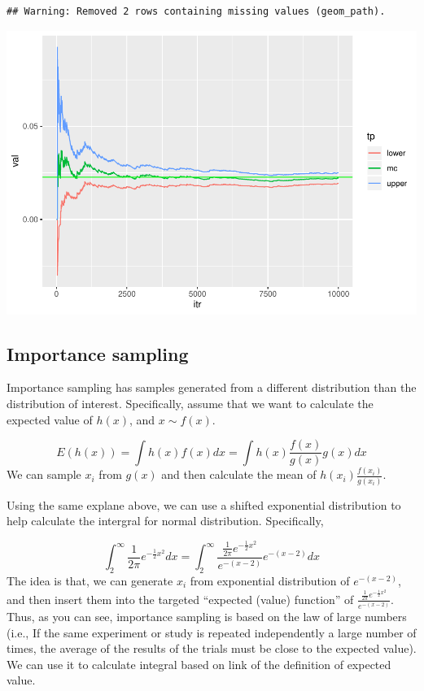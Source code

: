 \documentclass[]{book}
\begin{document}
\begin{verbatim}
## Warning: Removed 2 rows containing missing values (geom_path).
\end{verbatim}

\includegraphics{bookdown-demo_files/figure-latex/unnamed-chunk-16-1.pdf}

\subsection{Importance sampling}\label{importance-sampling}

Importance sampling has samples generated from a different distribution
than the distribution of interest. Specifically, assume that we want to
calculate the expected value of \(h(x)\), and \(x \sim f(x)\).

\[E(h(x))=\int h(x) f(x) dx = \int h(x) \frac{f(x)}{g(x)} g(x) dx \] We
can sample \(x_i\) from \(g(x)\) and then calculate the mean of
\(h(x_i) \frac{f(x_i)}{g(x_i)}\).

Using the same explane above, we can use a shifted exponential
distribution to help calculate the intergral for normal distribution.
Specifically,

\[\int_2^{\infty} \frac{1}{2 \pi} e^{-\frac{1}{2}x^2}dx = \int_2^{\infty} \frac{\frac{1}{2 \pi} e^{-\frac{1}{2}x^2}}{e^{-(x-2)}} e^{-(x-2)}dx \]
The idea is that, we can generate \(x_i\) from exponential distribution
of \(e^{-(x-2)}\), and then insert them into the targeted ``expected
(value) function'' of
\(\frac{\frac{1}{2 \pi} e^{-\frac{1}{2}x^2}}{e^{-(x-2)}}\). Thus, as you
can see, importance sampling is based on the law of large numbers (i.e.,
If the same experiment or study is repeated independently a large number
of times, the average of the results of the trials must be close to the
expected value). We can use it to calculate integral based on link of
the definition of expected value.
\end{document}

